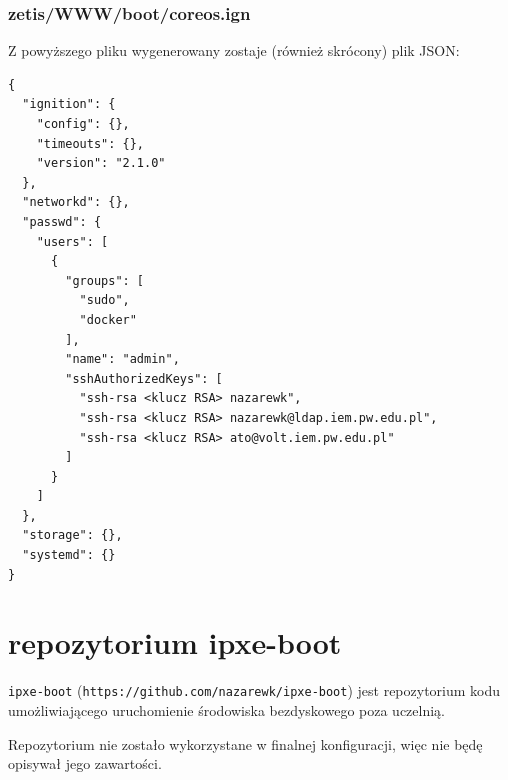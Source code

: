 \documentclass[a4paper,12pt,twoside,openany]{report}
\newcommand{\passthrough}[1]{#1}
\begin{document}
\hypertarget{zetiswwwbootcoreos.ign}{%
\subsubsection{zetis/WWW/boot/coreos.ign}\label{zetiswwwbootcoreos.ign}}

Z powyższego pliku wygenerowany zostaje (również skrócony) plik JSON:

\begin{lstlisting}
{
  "ignition": {
    "config": {},
    "timeouts": {},
    "version": "2.1.0"
  },
  "networkd": {},
  "passwd": {
    "users": [
      {
        "groups": [
          "sudo",
          "docker"
        ],
        "name": "admin",
        "sshAuthorizedKeys": [
          "ssh-rsa <klucz RSA> nazarewk",
          "ssh-rsa <klucz RSA> nazarewk@ldap.iem.pw.edu.pl",
          "ssh-rsa <klucz RSA> ato@volt.iem.pw.edu.pl"
        ]
      }
    ]
  },
  "storage": {},
  "systemd": {}
}
\end{lstlisting}

\hypertarget{repozytorium-ipxe-boot}{%
\section{repozytorium ipxe-boot}\label{repozytorium-ipxe-boot}}

\passthrough{\lstinline!ipxe-boot!}
(\passthrough{\lstinline!https://github.com/nazarewk/ipxe-boot!}) jest
repozytorium kodu umożliwiającego uruchomienie środowiska bezdyskowego
poza uczelnią.

Repozytorium nie zostało wykorzystane w finalnej konfiguracji, więc nie
będę opisywał jego zawartości.
\end{document}
